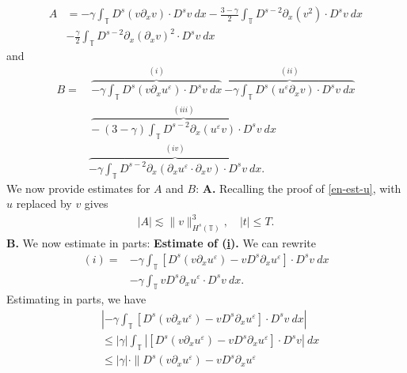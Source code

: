 \documentclass[12pt,reqno]{amsart}
\newcommand{\p}{\partial}
\newcommand{\ci}{\mathbb{T}}
\newcommand{\ee}{\varepsilon}
\theoremstyle{plain}  %
\theoremstyle{definition}
\begin{document}
\begin{appendices}
\begin{equation}
\begin{split}
			A
			& =  -\gamma \int_{\ci} D^s(v \p_x v) \cdot D^s v \
			dx
			- \frac{3- \gamma}{2} \int_\ci D^{s-2} \p_x (v^2) \cdot D^s v
			\ dx
			\\
			& - \frac{\gamma}{2}\int_\ci D^{s-2} \p_x (\p_x v)^2 \cdot D^s
			v \ dx
			\label{7u}
		\end{split}
	\end{equation}
	and
	\begin{equation}
		\begin{split}
			B 
			= & \ \overbrace{-\gamma \int_\ci D^s (v \p_x u^\ee ) \cdot D^s v \
			 dx}^{(i)} \ \overbrace{-\gamma \int_\ci D^s (u^\ee \p_x v) \cdot D^s v \
			 dx}^{(ii)}
			  \\
			  & \ \overbrace{- \ ( 3- \gamma) \int_\ci D^{s-2} \p_x (u^\ee v) \cdot D^s
			 v \ dx}^{(iii)}
			 \\
			 & \overbrace{-\gamma \int_\ci D^{s-2} \p_x
			(\p_x u^\ee \cdot \p_x v) \cdot D^s v \
			dx}^{(iv)}.
			\label{8u}
		\end{split}
	\end{equation}
	We now provide estimates for $A$ and $B$:
	\vskip0.1in
	{\bf A.} 
	Recalling the proof of \eqref{en-est-u}, with $u$ replaced by
	$v$ gives 
	\begin{equation}
		\begin{split}
			|A| \lesssim \|v\|_{H^s(\ci)}^3, \quad |t| \le T.
			\label{8'u}
		\end{split}
	\end{equation}
%
	{\bf B.} We now estimate in parts:
	\vskip0.1in
\vskip0.1in	
{\bf Estimate of (\hyperref[8u]{i}).} 
We can rewrite
	\begin{equation}
		\begin{split}
			(i)
			= & -\gamma \int_\ci \left[ D^s(v \p_x u^\ee) - v D^s
			\p_x u^\ee \right] \cdot D^s v \ dx
			\\
			& -  \gamma \int_\ci v D^s \p_x u^\ee \cdot D^s v \ dx.
			\label{1wap'}
		\end{split}
	\end{equation}
	Estimating in parts, we have
	\begin{equation}
		\begin{split}
			& |-\gamma \int_\ci \left[ D^s(v \p_x u^\ee) - v D^s
			\p_x u^\ee \right] \cdot D^s v \ dx |
			\\
			& \le |\gamma| \int_\ci |\left[ D^s(v \p_x u^\ee ) - v D^s
			\p_x u^\ee \right] \cdot D^s v| \ dx
			\\
			& \le |\gamma| \cdot \|D^s (v \p_x u^\ee) - v D^s \p_x u^\ee

\end{split}
\end{equation}
\end{appendices}
\end{document}
